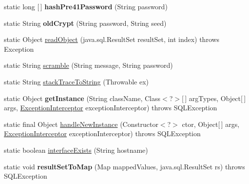 \begin{DoxyCompactItemize}
\item 
\mbox{\label{classcom_1_1mysql_1_1jdbc_1_1_util_ae6151f13a63db35822a8e8b18a0c6f89}} 
static long \mbox{[}$\,$\mbox{]} {\bfseries hash\+Pre41\+Password} (String password)
\item 
\mbox{\label{classcom_1_1mysql_1_1jdbc_1_1_util_a1f79cefa06e5313d4f6aa38bba41ca59}} 
static String {\bfseries old\+Crypt} (String password, String seed)
\item 
static Object \mbox{\hyperlink{classcom_1_1mysql_1_1jdbc_1_1_util_adb6404cb7c97c6020399a4388652e2f0}{read\+Object}} (java.\+sql.\+Result\+Set result\+Set, int index)  throws Exception 
\item 
static String \mbox{\hyperlink{classcom_1_1mysql_1_1jdbc_1_1_util_a15c89a6b2416bd75ff5691016907fc79}{scramble}} (String message, String password)
\item 
static String \mbox{\hyperlink{classcom_1_1mysql_1_1jdbc_1_1_util_a1354e3d746b6b93b38b8d535acd977a4}{stack\+Trace\+To\+String}} (Throwable ex)
\item 
\mbox{\label{classcom_1_1mysql_1_1jdbc_1_1_util_a07124391a1f1f1650a3256699238e3c7}} 
static Object {\bfseries get\+Instance} (String class\+Name, Class$<$?$>$\mbox{[}$\,$\mbox{]} arg\+Types, Object\mbox{[}$\,$\mbox{]} args, \mbox{\hyperlink{interfacecom_1_1mysql_1_1jdbc_1_1_exception_interceptor}{Exception\+Interceptor}} exception\+Interceptor)  throws S\+Q\+L\+Exception 
\item 
static final Object \mbox{\hyperlink{classcom_1_1mysql_1_1jdbc_1_1_util_ae60ce70ba2e8e536e773f4abab83c4c1}{handle\+New\+Instance}} (Constructor$<$?$>$ ctor, Object\mbox{[}$\,$\mbox{]} args, \mbox{\hyperlink{interfacecom_1_1mysql_1_1jdbc_1_1_exception_interceptor}{Exception\+Interceptor}} exception\+Interceptor)  throws S\+Q\+L\+Exception 
\item 
static boolean \mbox{\hyperlink{classcom_1_1mysql_1_1jdbc_1_1_util_a41c9a999e60af4e782a5c0eb055c7b22}{interface\+Exists}} (String hostname)
\item 
\mbox{\label{classcom_1_1mysql_1_1jdbc_1_1_util_a4537f774b47079e39a7c91c935ee0ca8}} 
static void {\bfseries result\+Set\+To\+Map} (Map mapped\+Values, java.\+sql.\+Result\+Set rs)  throws S\+Q\+L\+Exception 

\end{DoxyCompactItemize}

